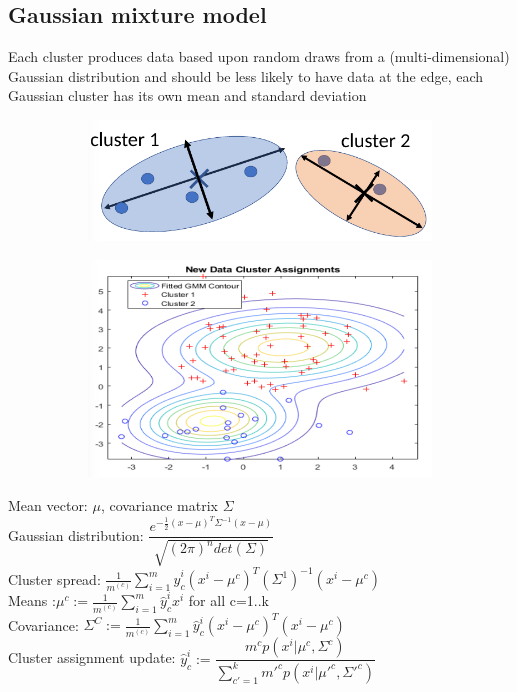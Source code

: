 \subsection{Gaussian mixture model}
 Each cluster produces data based upon random draws from a (multi-dimensional) Gaussian distribution and  should be less likely to have data at the edge, each Gaussian cluster has its own mean and standard deviation
\begin{figure}[H]
\centering
    \begin{subfigure}{.4\textwidth}
        \centering
        \includegraphics[width=1\linewidth]{images/CL/CL4.png}
        \caption{}
        \label{fig:sub1}
    \end{subfigure}
    \begin{subfigure}{.4 \textwidth}
        \centering
        \includegraphics[width=1\linewidth]{images/CL/CL5.png}
        \caption{}
        \label{fig:sub1}
    \end{subfigure}
    \caption{}
\end{figure}
Mean vector: $ \mu$, covariance matrix $\Sigma$ \\
Gaussian distribution: $ \dfrac{e^{-\frac{1}{2} (x-\mu)^T \Sigma^{-1} (x-\mu )}}{\sqrt{(2\pi)^n det(\Sigma)}}$\\
Cluster spread: $\frac{1}{m^{(c)}} \sum\limits_{i=1}^m \hat{y}_c^i (x^i - \mu^c )^T  (\Sigma^1)^{-1} (x^i - \mu ^c) $\\
Means :$ \mu^c := \frac{1}{m^{(c)}} \sum\limits_{i=1}^m \hat{y}_c^i x^i $ for all c=1..k\\
Covariance: $\Sigma^C := \frac{1}{m^{(c)}}  \sum\limits_{i=1}^m  \hat{y}_c^i (x^i - \mu^c )^T (x^i - \mu ^c)$\\
Cluster assignment update: $  \hat{y}_c^i := \dfrac{m^c p(x^i| \mu^c , \Sigma^c )}{\sum\limits_{c'=1}^k m'^c p(x^i| \mu'^c , \Sigma'^c)} $



